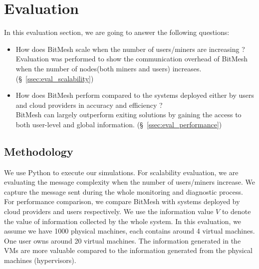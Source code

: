 \documentclass[11px]{article}
\newcommand{\projTitle}{BitMesh\xspace}
\begin{document}
\section{Evaluation}
In this evaluation section, we are going to answer the following questions:

\begin{itemize}
  \item How does \projTitle scale when the number of users/miners are increasing ? \\
      Evaluation was performed to show the communication overhead of \projTitle when the number of nodes(both miners and users) increases. (\S~\ref{ssec:eval_scalability})
  \item How does \projTitle perform compared to the systems deployed either by users and cloud providers in accuracy and efficiency ? \\
      \projTitle can largely outperform exiting solutions by gaining the access to both user-level and global information. (\S~\ref{ssec:eval_performance})
\end{itemize}

\subsection{Methodology}
We use Python to execute our simulations. For scalability evaluation, we are evaluating the message complexity when the number of users/miners increase. We capture the message sent during the whole monitoring and diagnostic process. For performance comparison, we compare \projTitle with systems deployed by cloud providers and users respectively. We use the information value $V$ to denote the value of information collected by the whole system. In this evaluation, we assume we have 1000 physical machines, each contains around 4 virtual machines. One user owns around 20 virtual machines. The information generated in the VMs are more valuable compared to the information generated from the physical machines (hypervisors).
\end{document}
